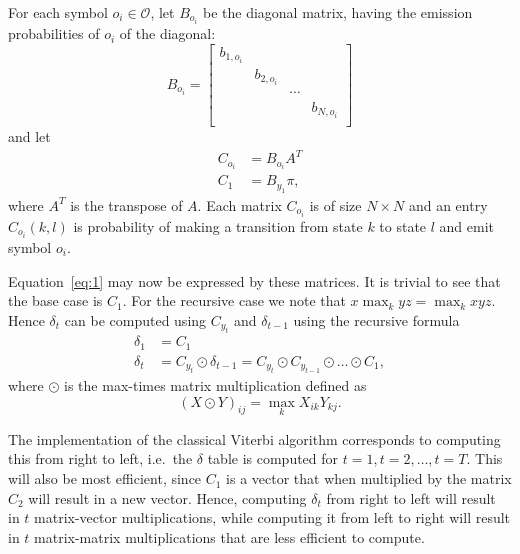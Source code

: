 For each symbol $o_i \in \mathcal{O}$, let $B_{o_i}$ be the diagonal matrix,
having the emission probabilities of $o_i$ of the diagonal:
\begin{equation*}
  B_{o_i} =
  \begin{bmatrix}
    b_{1, o_i} &            &        &            \\
               & b_{2, o_i} &        &            \\
               &            & \cdots &            \\
               &            &        & b_{N, o_i} \\
  \end{bmatrix}
\end{equation*}
and let
\begin{align*}
  C_{o_i}      & = B_{o_i} A^T                    \\
  C_1          & = B_{y_1} \pi,
\end{align*}
where $A^T$ is the transpose of $A$. Each matrix $C_{o_i}$ is of size $N \times
N$ and an entry $C_{o_i}(k, l)$ is probability of making a transition
from state $k$ to state $l$ and emit symbol $o_i$.

Equation~\eqref{eq:1} may now be expressed by these matrices. It is trivial to
see that the base case is $C_1$. For the recursive case we note that
$x \max_k y z = \max_k x y z$. Hence $\delta_t$ can be computed using $C_{y_t}$
and $\delta_{t - 1}$ using the recursive formula
\begin{equation}
  \label{eq:2}
  \begin{aligned}
    \delta_1 &= C_1 \\
    \delta_t &= C_{y_t} \odot \delta_{t - 1} = C_{y_t} \odot C_{y_{t-1}} \odot \dots \odot C_1,
  \end{aligned}
\end{equation}
where $\odot$ is the max-times matrix multiplication defined as
\begin{equation*}
{(X \odot Y)}_{ij} = \max_k X_{ik} Y_{kj}.
\end{equation*}

The implementation of the classical Viterbi algorithm corresponds to
computing this from right to left, i.e.\ the $\delta$ table is computed for $t
= 1, t=2, \dots, t=T$. This will also be most efficient, since
$C_1$ is a vector that when multiplied by the matrix $C_2$ will result in a new
vector. Hence, computing $\delta_t$ from right to left will result in $t$
matrix-vector multiplications, while computing it from left to right will
result in $t$ matrix-matrix multiplications that are less efficient to compute.

